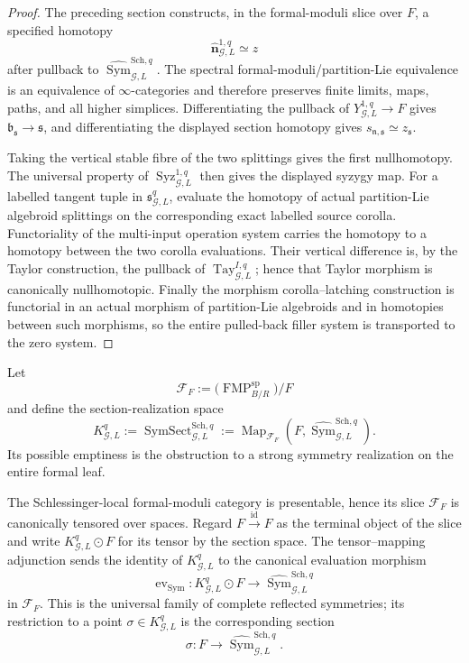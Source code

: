 \begin{proof}
The preceding section constructs, in the formal-moduli slice over $F$, a specified
homotopy
\[
\widehat{\mathbf n}_{\mathcal G,L}^{1,q}\simeq z
\]
after pullback to
$\widehat{\operatorname{Sym}}_{\mathcal G,L}^{\mathrm{Sch},q}$.
The spectral formal-moduli/partition-Lie equivalence is an equivalence of
$\infty$-categories and therefore preserves finite limits, maps, paths, and all
higher simplices.  Differentiating the pullback of
$Y_{\mathcal G,L}^{1,q}\to F$ gives
$\mathfrak b_{\mathfrak s}\to\mathfrak s$, and differentiating the displayed
section homotopy gives
$s_{\mathfrak n,\mathfrak s}\simeq z_{\mathfrak s}$.

Taking the vertical stable fibre of the two splittings gives the first
nullhomotopy.  The universal property of
$\operatorname{Syz}_{\mathcal G,L}^{1,q}$ then gives the displayed syzygy map.
For a labelled tangent tuple in $\mathfrak s_{\mathcal G,L}^{q}$, evaluate the
homotopy of actual partition-Lie algebroid splittings on the corresponding exact
labelled source corolla.  Functoriality of the multi-input operation system carries
the homotopy to a homotopy between the two corolla evaluations.  Their vertical
difference is, by the Taylor construction, the pullback of
$\operatorname{Tay}_{\mathcal G,L}^{I,q}$; hence that Taylor morphism is
canonically nullhomotopic.  Finally the morphism corolla--latching construction is
functorial in an actual morphism of partition-Lie algebroids and in homotopies
between such morphisms, so the entire pulled-back filler system is transported to
the zero system.
\end{proof}

\begin{construction}
\label{constr:symmetry-noether-complete-symmetry-section-realization-and-universal-evaluation}
Let
\[
\mathcal F_F
:=
\bigl(\operatorname{FMP}^{\mathrm{sp}}_{B/R}\bigr)/F
\]
and define the section-realization space
\[
\boxed{
K_{\mathcal G,L}^{q}
:=
\operatorname{SymSect}_{\mathcal G,L}^{\mathrm{Sch},q}
:=
\operatorname{Map}_{\mathcal F_F}
\left(
F,
\widehat{\operatorname{Sym}}_{\mathcal G,L}^{\mathrm{Sch},q}
\right).
}
\]
Its possible emptiness is the obstruction to a strong symmetry realization on the
entire formal leaf.

The Schlessinger-local formal-moduli category is presentable, hence its slice
$\mathcal F_F$ is canonically tensored over spaces.  Regard
$F\xrightarrow{\mathrm{id}}F$ as the terminal object of the slice and write
$K_{\mathcal G,L}^{q}\odot F$ for its tensor by the section space.  The tensor--mapping
adjunction sends the identity of $K_{\mathcal G,L}^{q}$ to the canonical evaluation
morphism
\[
\boxed{
\operatorname{ev}_{\mathrm{Sym}}:
K_{\mathcal G,L}^{q}\odot F
\longrightarrow
\widehat{\operatorname{Sym}}_{\mathcal G,L}^{\mathrm{Sch},q}
}
\]
in $\mathcal F_F$.  This is the universal family of complete reflected symmetries;
its restriction to a point
$\sigma\in K_{\mathcal G,L}^{q}$ is the corresponding section
\[
\sigma:F\longrightarrow
\widehat{\operatorname{Sym}}_{\mathcal G,L}^{\mathrm{Sch},q}.
\]
\end{construction}

